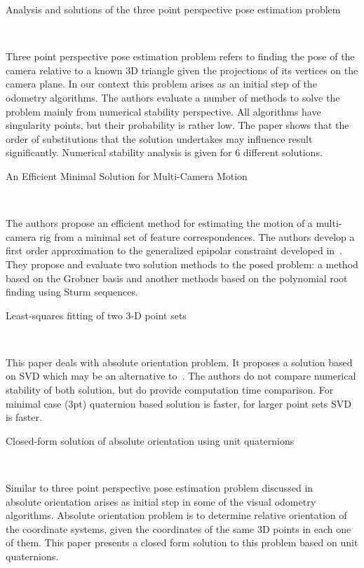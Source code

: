 \documentclass[10pt]{article}         %
\begin{document}
\begin{enumerate}
  {\Large \item Analysis and solutions of the three point perspective pose estimation problem}~\cite{haralick1991analysis}

  Three point perspective pose estimation problem refers to finding
  the pose of the camera relative to a known 3D triangle given the
  projections of its vertices on the camera plane.  In our context
  this problem arises as an initial step of the odometry algorithms.
  The authors evaluate a number of methods to solve the problem mainly
  from numerical stability perspective.  All algorithms have
  singularity points, but their probability is rather low. The paper
  shows that the order of substitutions that the solution undertakes
  may influence result significantly.  Numerical stability analysis is
  given for 6 different solutions.

  {\Large \item An Efficient Minimal Solution for Multi-Camera
    Motion}~\cite{67}

  The authors propose an efficient method for estimating the motion of
  a multi-camera rig from a minimal set of feature correspondences.
  The authors develop a first order approximation to the generalized
  epipolar constraint developed in~\cite{grossberg2001general}.  They
  propose and evaluate two solution methods to the posed problem: a
  method based on the Grobner basis and another methods based on the
  polynomial root finding using Sturm sequences.

  {\Large \item Least-squares fitting of two 3-D point
    sets}~\cite{arun1987least}

  This paper deals with absolute orientation problem.  It proposes a
  solution based on SVD which may be an alternative
  to~\cite{horn1987closed}.  The authors do not compare numerical
  stability of both solution, but do provide computation time
  comparison.  For minimal case (3pt) quaternion based solution is
  faster, for larger point sets SVD is faster.

  {\Large \item Closed-form solution of absolute orientation using
    unit quaternions}~\cite{horn1987closed}
  
  Similar to three point perspective pose estimation problem discussed
  in ~\cite{haralick1991analysis} absolute orientation arises as
  initial step in some of the visual odometry algorithms.  Absolute
  orientation problem is to determine relative orientation of the
  coordinate systems, given the coordinates of the same 3D points in
  each one of them.  This paper presents a closed form solution to
  this problem based on unit quaternions.


\end{enumerate}
\end{document}
